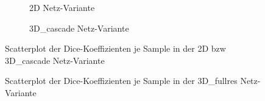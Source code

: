 \begin{figure}[H]
\centering
\begin{minipage}{.5\textwidth}
\begin{subfigure}{\textwidth}
\centering

\caption{2D Netz-Variante}
\label{pic:Dice_109-2d}
\end{subfigure}
\end{minipage}%
\begin{minipage}{.5\textwidth}
\begin{subfigure}{\textwidth}

\caption{3D\_cascade Netz-Variante}
\label{pic:Dice_109-cascade}
\end{subfigure}
\end{minipage}

\caption{Scatterplot der Dice-Koeffizienten je Sample in der 2D bzw 3D\_cascade Netz-Variante}
\label{pic:Dice_109-A}
\end{figure}

\begin{figure}[H]

\caption{Scatterplot der Dice-Koeffizienten je Sample in der 3D\_fullres Netz-Variante}
\label{pic:Dice_109-B}
\end{figure}



